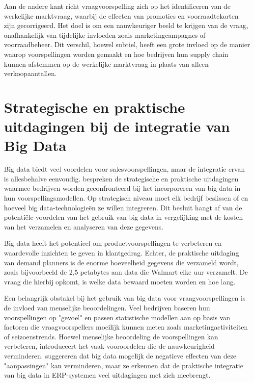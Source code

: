 \vspace{1 em}

Aan de andere kant richt vraagvoorspelling zich op het identificeren van de werkelijke marktvraag, waarbij de effecten van promoties en voorraadtekorten zijn gecorrigeerd. Het doel is om een nauwkeuriger beeld te krijgen van de vraag, onafhankelijk van tijdelijke invloeden zoals marketingcampagnes of voorraadbeheer. Dit verschil, hoewel subtiel, heeft een grote invloed op de manier waarop voorspellingen worden gemaakt en hoe bedrijven hun supply chain kunnen afstemmen op de werkelijke marktvraag in plaats van alleen verkoopaantallen.

\section{Strategische en praktische uitdagingen bij de integratie van Big Data}  
Big data biedt veel voordelen voor salesvoorspellingen, maar de integratie ervan is allesbehalve eenvoudig. \textcite{Boone2019} bespreken de strategische en praktische uitdagingen waarmee bedrijven worden geconfronteerd bij het incorporeren van big data in hun voorspellingsmodellen. Op strategisch niveau moet elk bedrijf beslissen of en hoeveel big data-technologieën ze willen integreren. Dit besluit hangt af van de potentiële voordelen van het gebruik van big data in vergelijking met de kosten van het verzamelen en analyseren van deze gegevens. 

\vspace{1 em}

Big data heeft het potentieel om productvoorspellingen te verbeteren en waardevolle inzichten te geven in klantgedrag. Echter, de praktische uitdaging van demand planners is de enorme hoeveelheid gegevens die verzameld wordt, zoals bijvoorbeeld de 2,5 petabytes aan data die Walmart elke uur verzamelt. De vraag die hierbij opkomt, is welke data bewaard moeten worden en hoe lang. 

\vspace{45 mm}

Een belangrijk obstakel bij het gebruik van big data voor vraagvoorspellingen is de invloed van menselijke beoordelingen. Veel bedrijven baseren hun voorspellingen op "gevoel" en passen statistische modellen aan op basis van factoren die vraagvoorspellers moeilijk kunnen meten zoals marketingactiviteiten of seizoenstrends. Hoewel menselijke beoordeling de voorspellingen kan verbeteren, introduceert het vaak vooroordelen die de nauwkeurigheid verminderen. suggereren dat big data mogelijk de negatieve effecten van deze "aanpassingen" kan verminderen, maar ze erkennen dat de praktische integratie van big data in ERP-systemen veel uitdagingen met zich meebrengt.

